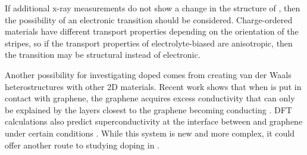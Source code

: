 If additional x-ray measurements do not show a change in the structure of \ruclnospace , then the possibility of an electronic transition should be considered. Charge-ordered materials have different transport properties depending on the orientation of the stripes, so if the transport properties of electrolyte-biased \rucl are anisotropic, then the transition may be structural instead of electronic.

Another possibility for investigating doped \rucl comes from creating van der Waals heterostructures with other 2D materials. Recent work shows that when \rucl is put in contact with graphene, the graphene acquires excess conductivity that can only be explained by the \rucl layers closest to the graphene becoming conducting \cite{Zhou2018b}. DFT calculations also predict superconductivity at the interface between \rucl and graphene under certain conditions \cite{Biswas2019}. While this system is new and more complex, it could offer another route to studying doping in \rucl.